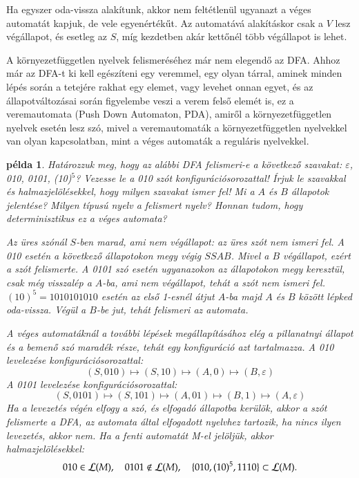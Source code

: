 \documentclass[a4paper]{article}
\newtheorem{pelda}{példa}[section]
\begin{document}
Ha egyszer oda-vissza alakítunk, akkor nem feltétlenül ugyanazt a véges
automatát kapjuk, de vele egyenértékűt. Az automatává alakításkor csak a
$V$ lesz végállapot, és esetleg az $S$, míg kezdetben akár kettőnél több
végállapot is lehet.

A környezetfüggetlen nyelvek felismeréséhez már nem elegendő az DFA.
Ahhoz már az DFA-t ki kell egészíteni egy veremmel, egy olyan tárral,
aminek minden lépés során a tetejére rakhat egy elemet, vagy levehet
onnan egyet, és az állapotváltozásai során figyelembe veszi a verem
felső elemét is, ez a veremautomata (Push Down Automaton, PDA), amiről a
környezetfüggetlen nyelvek esetén lesz szó, mivel a veremautomaták a
környezetfüggetlen nyelvekkel van olyan kapcsolatban, mint a véges
automaták a reguláris nyelvekkel.

\begin{pelda}
Határozzuk meg, hogy az alábbi DFA felismeri-e a következő szavakat:
$\varepsilon$, 010, 0101, (10)$^5$? Vezesse le a 010 szót
konfigurációsorozattal! Írjuk le szavakkal és
halmazjelölésekkel, hogy milyen szavakat ismer fel! Mi a $A$ és $B$
állapotok jelentése?
Milyen típusú nyelv a felismert nyelv?
Honnan tudom, hogy determinisztikus ez a véges automata?


Az üres szónál $S$-ben marad, ami nem végállapot: az üres szót nem
ismeri fel. A 010 esetén a következő állapotokon megy végig
$SSAB$. Mivel a $B$ végállapot, ezért a szót felismerte. A
0101 szó esetén ugyanazokon az állapotokon megy keresztül, csak még
visszalép a $A$-ba, ami nem végállapot, tehát a szót nem ismeri fel.
$(10)^5=1010101010$ esetén az első 1-esnél átjut $A$-ba majd $A$ és
$B$ között lépked oda-vissza. Végül a $B$-be jut, tehát felismeri az
automata.

A véges automatáknál a további lépések megállapításához elég a
pillanatnyi állapot és a bemenő szó maradék része, tehát egy
konfiguráció azt tartalmazza.
A 010 levelezése konfigurációsorozattal:
\[(S, 010) \mapsto (S, 10) \mapsto (A, 0) \mapsto (B, \varepsilon)\]
A 0101 levelezése konfigurációsorozattal:
\[(S, 0101) \mapsto (S, 101) \mapsto (A, 01) \mapsto (B, 1) \mapsto (A, \varepsilon)\]
Ha a levezetés végén elfogy a szó, és elfogadó állapotba kerülök, akkor
a szót felismerte a DFA, az automata által elfogadott nyelvhez
tartozik, ha nincs ilyen levezetés, akkor nem. Ha a fenti automatát M-el
jelöljük, akkor halmazjelölésekkel: \[010 \in {\cal L} (M), \quad 0101
\notin {\cal L} (M), \quad \{010, (10)^5, 1110\} \subset {\cal L} (M).\]


\end{pelda}
\end{document}
